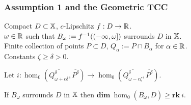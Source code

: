 \begin{frame}
  \frametitle{{\small Assumption 1 and the Geometric TCC}}
  \begin{small}
    Compact $D\subset\mathbb{X}$, $c$-Lipschitz $f : D\to\mathbb{R}$.\\
    $\omega\in\mathbb{R}$ such that $B_{\omega} := f^{-1}((-\infty, \omega])$ surrounds $D$ in $\mathbb{X}$.\\
    Finite collection of points $P\subset D$, $Q_\alpha := P\cap B_\alpha$ for $\alpha\in\mathbb{R}$.\\
    Constants $\zeta\geq\delta > 0$.
  \end{small}


  \begin{lemma}\label{lem:psurj}
    Let $i : \hom_0(\overline{Q_{\omega+c\delta}^\delta}, \overline{P^\delta})\to \hom_0(\overline{Q_{\omega-c\zeta}^\delta}, \overline{P^\delta})$.

    If $B_\omega$ surrounds $D$ in $\mathbb{X}$ then $\mathbf{dim}~\hom_0(\overline{B_\omega}, \overline{D})\geq \mathbf{rk}~i$.
  \end{lemma}

\end{frame}


